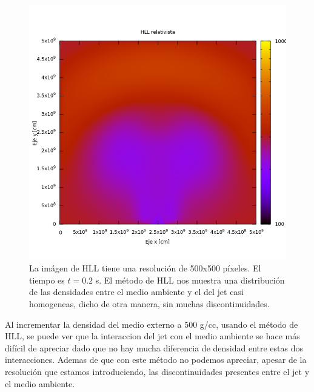 \documentclass[12pt,a4paper]{book}
\begin{document}
\begin{figure}[H] \label{fig:jet_hll_100_ma_300_500pix} %
\centering
\includegraphics[scale=0.5]{./Figuras/Pruebas/Prueba_jet/hll/jet_hll_100_ma_300_500pix} 
\caption{La imágen de HLL tiene una resolución de 500x500 píxeles. El tiempo es $t =0.2 $ s. El método de HLL nos muestra una distribución de las densidades entre el medio ambiente y el del jet casi homogeneas, dicho de otra manera, sin muchas discontinuidades. }
\end{figure}

Al incrementar la densidad del medio externo a 500 g/cc, usando el método de HLL, se puede ver que la interaccion del jet con el medio ambiente se hace más difícil de apreciar dado que no hay mucha diferencia de densidad entre estas dos interacciones. Ademas de que con este método no podemos apreciar, apesar de la resolución que estamos introduciendo, las discontinuidades presentes entre el jet y el medio ambiente. 
\end{document}
